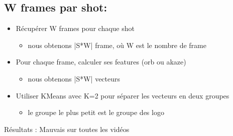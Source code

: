 \documentclass[11pt]{article}
\begin{document}
\subsection{W frames par shot:}
\label{sec-6-5}
\begin{itemize}
\item Récupérer W frames pour chaque shot 
\begin{itemize}
\item nous obtenons |S*W| frame, où W est le nombre de frame
\end{itemize}
\item Pour chaque frame, calculer ses features (orb ou akaze) 
\begin{itemize}
\item nous obtenons |S*W| vecteurs
\end{itemize}
\item Utiliser KMeans avec K=2 pour séparer les vecteurs en deux groupes 
\begin{itemize}
\item le groupe le plus petit est le groupe des logo
\end{itemize}
\end{itemize}

Résultats : 
Mauvais sur toutes les vidéos
\end{document}
